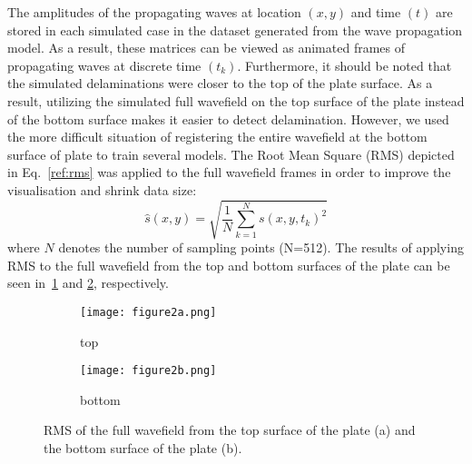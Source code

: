 The amplitudes of the propagating waves at location \((x,y)\) and time \((t)\) are stored in each simulated case in the dataset generated from the wave propagation model.
As a result, these matrices can be viewed as animated frames of propagating waves at discrete time \((t_k)\).
Furthermore, it should be noted that the simulated delaminations were closer to the top of the plate surface.
As a result, utilizing the simulated full wavefield on the top surface of the plate instead of the bottom surface makes it easier to detect delamination.
However, we used the more difficult situation of registering the entire wavefield at the bottom surface of plate to train several models.
The Root Mean Square (RMS) depicted in Eq.~\ref{ref:rms} was applied to the full wavefield frames in order to improve the visualisation and shrink data size:
\begin{equation}
	\hat{s}(x,y) = \sqrt{\frac{1}{N}\sum_{k=1}^{N} s(x,y,t_k)^2}
	\label{ref:rms}
\end{equation}
where \(N\) denotes the number of sampling points (N=512).
The results of applying RMS to the full wavefield from the top and bottom surfaces of the plate can be seen in~\ref{fig:rmstop} and \ref{fig:rmsbottom}, respectively.
\begin{figure}[!h]
	\centering
	\begin{subfigure}[b]{0.49\textwidth}		
		\centering
		\texttt{[image: figure2a.png]}
		\caption{top}
		\label{fig:rmstop}
	\end{subfigure}
	\hfill
	\begin{subfigure}[b]{0.49\textwidth}		
		\centering
		\texttt{[image: figure2b.png]}
		\caption{bottom}
		\label{fig:rmsbottom}
	\end{subfigure}
	\caption{RMS of the full wavefield from the top surface of the plate (a) and the bottom surface of the plate (b).}
	\label{fig:rms}
\end{figure} 
